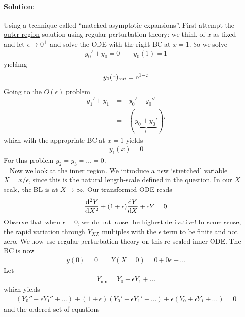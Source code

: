 \paragraph{Solution:} Using a technique called ``matched asymptotic expansions''. First attempt the \underline{outer region} solution using regular perturbation theory: we think of $x$ as fixed and let $\epsilon \rightarrow 0^+$ and solve the ODE with the right BC at $x=1$. So we solve
\begin{gather*}
	y_0' + y_0 = 0 \qquad y_0(1) = 1
\end{gather*}
yielding
\begin{gather}
	y_0(x)_\mathrm{out} = \mathrm{e}^{1-x}
\end{gather}
Going to the $O(\epsilon)$ problem
\begin{align*}
	y_1' + y_1 &= -y_0' - y_0'' \\
		&= -(\underbrace{y_0 + y_0'}_0)'
\end{align*}
which with the appropriate BC at $x=1$ yields
\begin{gather*}
	y_1(x) = 0
\end{gather*}
For this problem $y_2 = y_3 = \dots = 0$. \\
\ \newline
Now we look at the \underline{inner region}. We introduce a new `stretched' variable $X = x/\epsilon$, since this is the natural length-scale defined in the question. In our $X$ scale, the BL is at $X \rightarrow \infty$. Our transformed ODE reads
\begin{gather}\label{eqn:wk12-inner-ode}
	\frac{\mathrm{d}^2 Y}{\mathrm{d} X^2} + (1+\epsilon) \frac{\mathrm{d} Y}{\mathrm{d} X} + \epsilon Y = 0
\end{gather}
Observe that when $\epsilon = 0$, we do not loose the highest derivative! In some sense, the rapid variation through $Y_{XX}$ multiples with the $\epsilon$ term to be finite and not zero. We now use regular perturbation theory on this re-scaled inner ODE. The BC is now 
\begin{gather*}
	y(0) = 0 \qquad Y(X=0) = 0 + 0\epsilon + \dots 
\end{gather*} 
Let
\begin{gather*}
	Y_\mathrm{inn} = Y_0 + \epsilon Y_1 + \dots 
\end{gather*}
which yields 
\begin{gather*}
	(Y_0'' + \epsilon Y_1'' + \dots ) + (1+\epsilon)(Y_0' + \epsilon Y_1' + \dots ) + \epsilon(Y_0 + \epsilon Y_1 + \dots) = 0
\end{gather*}
and the ordered set of equations
